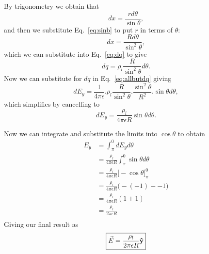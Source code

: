 \documentclass{tufte-handout}
\newcommand{\uvec}[1]{{\bm{\hat{\textnormal{\bfseries #1}}}}}
\begin{document}
By trigonometry we obtain that
\begin{equation}
dx = \frac{rd\theta}{\sin\theta},
\end{equation}
and then we substitute Eq.~\ref{eq:sinb} to put $r$ in terms of $\theta$:
\begin{equation}
\label{eq:dx}
dx = \frac{Rd\theta}{\sin^2\theta},
\end{equation}
which we can substitute into Eq.~\ref{eq:dq} to give
\begin{equation}
\label{eq:dqintheta}
dq = \rho_l \frac{R}{\sin^2\theta}d\theta.
\end{equation}
Now we can substitute for $dq$ in Eq.~\ref{eq:allbutdq} giving
\begin{equation}
dE_y = \frac{1}{4\pi\epsilon}.\rho_l \frac{R}{\sin^2\theta}.\frac{\sin^2\theta}{R^2}.\sin\theta d\theta,
\end{equation} 
which simplifies by cancelling to
\begin{equation}
\label{eq:deyall}
dE_y = \frac{\rho_l}{4\pi\epsilon{}R}\sin\theta d\theta.
\end{equation} 
\begin{marginfigure}

\end{marginfigure}
Now we can integrate
 and substitute the limits into $\cos\theta$ to obtain
\begin{align}
\label{eq:intdey}
E_y &= \int_{\pi}^{0}dE_y d\theta \\
& =  \frac{\rho_l}{4\pi\epsilon{}R} \int_{\pi}^{0}\sin\theta d\theta \\
& = \frac{\rho_l}{4\pi\epsilon{}R} \Big[-\cos\theta\Big]_{\pi}^{0}\\
& = \frac{\rho_l}{4\pi\epsilon{}R} \big(-(-1) --1 \big) \\
& = \frac{\rho_l}{4\pi\epsilon{}R} \left(1+1\right) \\
& = \frac{\rho_l}{2\pi\epsilon{}R}\\
\end{align}
Giving our final result as
\begin{equation*}
\boxed{\vec{E} = \frac{\rho_l}{2\pi\epsilon{}R}\uvec{y}}
\end{equation*}
\end{document}
